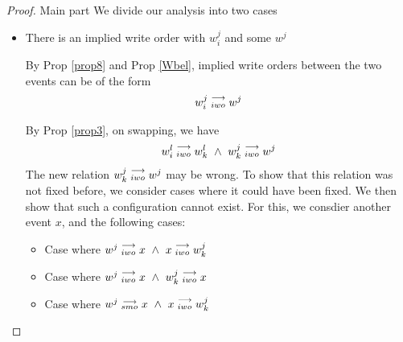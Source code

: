 \begin{proof}{Main part}
                We divide our analysis into two cases 
                \begin{itemize}
                    \item There is an implied write order with $w_i^j$ and some $w^j$
                        
                        By Prop \ref{prop8} and Prop \ref{Wbel}, implied write orders between the two events can be of the form 
                        \begin{align*}
                            w_i^j\stackrel{\longrightarrow}{_{iwo}}w^j 
                        \end{align*}

                        By Prop \ref{prop3}, on swapping, we have 
                        \begin{align*}
                            \reln{w_i^l}{iwo}{w_k^l} \ \wedge \ \reln{w_k^j}{iwo}{w^j}
                        \end{align*}
                        The new relation $w_k^j\stackrel{\longrightarrow}{_{iwo}}w^j$ may be wrong. 
                        To show that this relation was not fixed before, we consider cases where it could have been fixed. We then show that such a configuration cannot exist. For this, we consdier another event $x$, and the following cases:

                        \begin{itemize}
                            \item Case where $w^j\stackrel{\longrightarrow}{_{iwo}}x \ \wedge \ x\stackrel{\longrightarrow}{_{iwo}}w_k^j$
                            \item Case where $w^j\stackrel{\longrightarrow}{_{iwo}}x \ \wedge \ w_k^j\stackrel{\longrightarrow}{_{iwo}}x$
                            \item Case where $w^j\stackrel{\longrightarrow}{_{smo}}x \ \wedge \ x\stackrel{\longrightarrow}{_{iwo}}w_k^j$



\end{itemize}
\end{itemize}
\end{proof}
